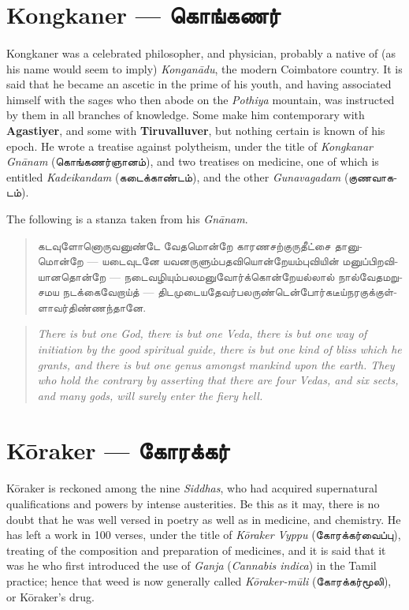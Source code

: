 \documentclass{article}
\newcommand{\TamilText}[1]{\texttamil{#1}}
\newcommand{\TamilBold}[1]{\texttamil{\textbf{#1}}}
\newcommand{\tam}[1]{\TamilText{#1}}
\newcommand{\tambold}[1]{\TamilBold{#1}}
\begin{document}
\section{Kongkaner --- \tambold{கொங்கணர்}}
\paragraph{}
Kongkaner was a celebrated philosopher, and physician, probably a native of (as his name would seem to imply) \emph{Kongan\={a}du}, the modern Coimbatore country. It is said that he became an ascetic in the prime of his youth, and having associated himself with the sages who then abode on the \emph{Pothiya} mountain, was instructed by them in all branches of knowledge. Some make him contemporary with \textbf{Agastiyer}, and some with \textbf{Tiruvalluver}, but nothing certain is known of his epoch. He wrote a treatise against polytheism, under the title of \emph{Kongkanar Gn\={a}nam} (\tam{கொங்கணர்ஞானம்}), and two treatises on medicine, one of which is entitled \emph{Kadeikandam} (\tam{கடைக்காண்டம்}), and the other \emph{Gunavagadam} (\tam{குணவாகடம்}).

The following is a stanza taken from his \emph{Gn\={a}nam}.
\begin{quotation}\small
\tam{கடவுளோனொருவனுண்டே வேதமொன்றே காரணசற்குருதீட்‌சை தானுமொன்றே} --- \tam{யடைவுடனே யவனருளும்பதவியொன்றேயம்‌புவியின்‌ மனுப்பிறவியானதொன்றே} --- \tam{நடைவழியும்பலமனுவோர்க்கொன்றேயல்லால்‌ நால்வேதமறுசமய நடக்கைவேறாய்த்} --- \tam{திடமுடையதேவர்பலருண்டென்போர்கடீய்நரகுக்குள்ளாவர்‌திண்ணந்தானே}.
\end{quotation}
\begin{quotation}\small
\emph{There is but one God, there is but one Veda, there is but one way of initiation by the good spiritual guide, there is but one kind of bliss which he grants, and there is but one genus amongst mankind upon the earth. They who hold the contrary by asserting that there are four Vedas, and six sects, and many gods, will surely enter the fiery hell.}
\end{quotation}

\section{K\={o}raker --- \tambold{கோரக்கர்}}
\paragraph{}
K\={o}raker is reckoned among the nine \emph{Siddhas}, who had acquired supernatural qualifications and powers by intense austerities. Be this as it may, there is no doubt that he was well versed in poetry as well as in medicine, and chemistry. He has left a work in 100 verses, under the title of \emph{K\={o}raker Vyppu} (\tam{கோரக்கர்வைப்பு}), treating of the composition and preparation of medicines, and it is said that it was he who first introduced the use of \emph{Ganja} (\emph{Cannabis indica}) in the Tamil practice; hence that weed is now generally called \emph{K\={o}raker-m\={u}li} (\tam{கோரக்கர்மூலி}), or K\={o}raker's drug.
\end{document}
